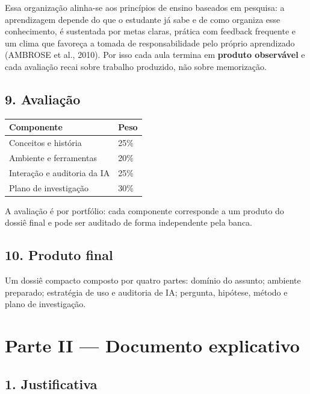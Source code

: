 \documentclass[11pt,a4paper]{article}
\begin{document}
Essa organização alinha-se aos princípios de ensino baseados em pesquisa: a aprendizagem
depende do que o estudante já sabe e de como organiza esse conhecimento, é sustentada por
metas claras, prática com feedback frequente e um clima que favoreça a tomada de
responsabilidade pelo próprio aprendizado (AMBROSE et al., 2010). Por isso cada aula termina
em \textbf{produto observável} e cada avaliação recai sobre trabalho produzido, não sobre
memorização.

\subsection*{9. Avaliação}

{\small
\begin{tabular}{|p{}|p{}|}
\hline
\textbf{Componente} & \textbf{Peso} \\
\hline
Conceitos e história & 25\% \\
\hline
Ambiente e ferramentas & 20\% \\
\hline
Interação e auditoria da IA & 25\% \\
\hline
Plano de investigação & 30\% \\
\hline
\end{tabular}
}

A avaliação é por portfólio: cada componente corresponde a um produto do dossiê final e pode
ser auditado de forma independente pela banca.

\subsection*{10. Produto final}

Um dossiê compacto composto por quatro partes: domínio do assunto; ambiente preparado;
estratégia de uso e auditoria de IA; pergunta, hipótese, método e plano de investigação.

\newpage

\section*{Parte II --- Documento explicativo}

\subsection*{1. Justificativa}
\end{document}
